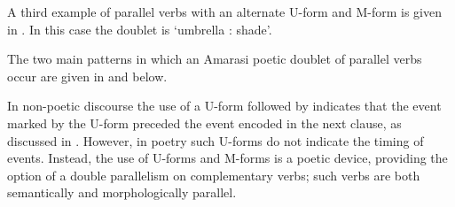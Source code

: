 A third example of parallel verbs with an alternate U-form and M-form
is given in .
In this case the doublet is  `umbrella : shade'.

\begin{exe}
	\label{ex:130825-3, 1.15-1.21}
	\begin{xlist}
		\vspace{4pt}
	\end{xlist}
\end{exe}

The two main patterns in which an Amarasi poetic doublet
of parallel verbs occur are given
in  and  below.

\begin{exe}
	\label{ex:AmaParVerPai}
	\label{ex:AmaParVerPai2}
\end{exe}

In non-poetic discourse the use of a U-form followed by 
indicates that the event marked by the U-form preceded the
event encoded in the next clause, as discussed in .
However, in poetry such U-forms do not indicate the timing of events.
Instead, the use of U-forms and M-forms is a poetic device,
providing the option of a double parallelism on complementary verbs;
such verbs are both semantically and morphologically parallel.